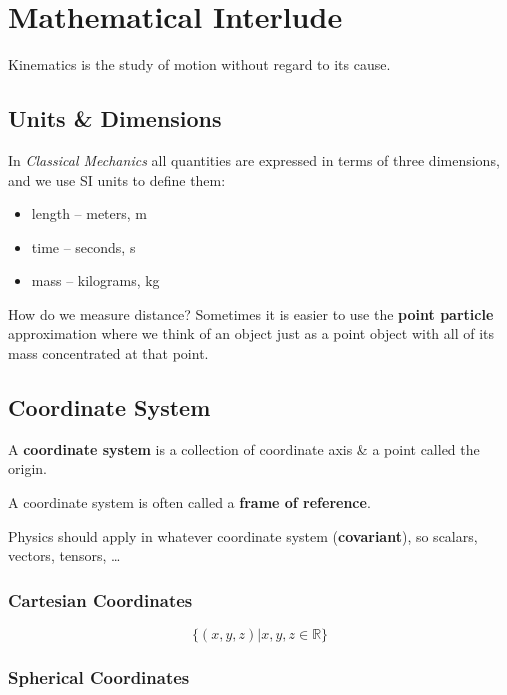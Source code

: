 \chapter{Mathematical Interlude}

\begin{definition}
	Kinematics is the study of motion without regard to its cause.
\end{definition}

\section{Units \& Dimensions}

In \textit{Classical Mechanics} all quantities are expressed in terms of three dimensions, and we use SI units to define them:

\begin{itemize}
	\item length -- meters, m
	\item time -- seconds, s
	\item mass -- kilograms, kg
\end{itemize}

How do we measure distance? Sometimes it is easier to use the \textbf{point particle} approximation where we think of an object just as a point object with all of its mass concentrated at that point.

\section{Coordinate System}

A \textbf{coordinate system} is a collection of coordinate axis \& a point called the origin.

A coordinate system is often called a \textbf{frame of reference}.

Physics should apply in whatever coordinate system (\textbf{covariant}), so scalars, vectors, tensors, \ldots

\subsection{Cartesian Coordinates}

\begin{equation}
	\{(x, y, z) \vert x, y, z \in \mathbb{R}\}
\end{equation}

\subsection{Spherical Coordinates}

